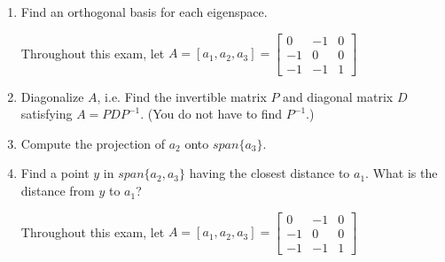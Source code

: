 \documentclass[11pt]{amsart}
\begin{document}
\begin{enumerate}
\item Find an orthogonal basis for each eigenspace.
\vspace{.5in}\vspace{.5in}\vspace{.5in}\vspace{.5in}\vspace{.5in}\vspace{.5in}
\vspace{.5in}\vspace{.5in}


\newpage
Throughout this exam, let 
$A = [a_1, a_2, a_3] = 
\begin{bmatrix}
0 & -1 & 0\\
-1 & 0 & 0 \\
-1 & -1 & 1
\end{bmatrix}
$
\vspace{.2in}

\item  Diagonalize $A$, i.e. Find the invertible matrix $P$ and diagonal matrix $D$ satisfying $A = P D P^{-1}.$ 
(You do not have to find $P^{-1}$.)
\vspace{.5in}\vspace{.5in}
\vspace{.5in}\vspace{.5in}




\item 
Compute the projection of $a_2$ onto  $span\{a_3\}$.
\vspace{.5in}\vspace{.5in}
\vspace{.5in}\vspace{.5in}


\item Find a point $y$ in $span\{a_2, a_3\}$ having the closest distance to $a_1$. What is the distance from $y$ to $a_1$?

\vspace{.5in}\vspace{.5in}
\vspace{.5in}\vspace{.5in}



\newpage
Throughout this exam, let 
$A = [a_1, a_2, a_3] = 
\begin{bmatrix}
0 & -1 & 0\\
-1 & 0 & 0 \\
-1 & -1 & 1
\end{bmatrix}
$
\vspace{.2in}


\end{enumerate}
\end{document}
